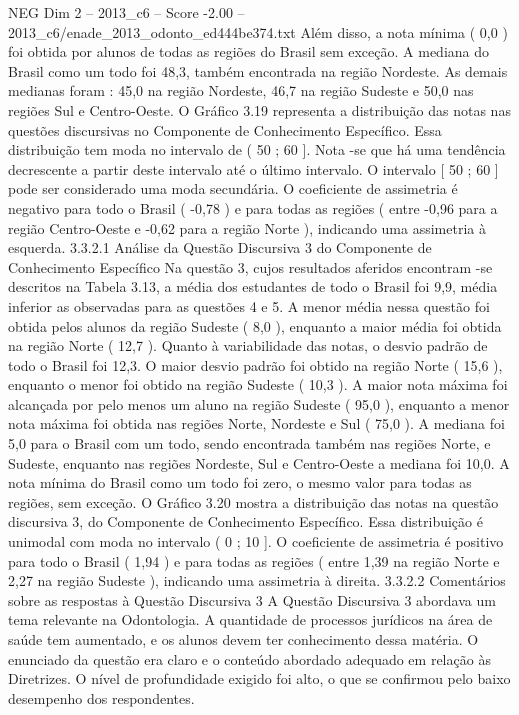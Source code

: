 \begin{textsample}{NEG Dim 2 – 2013\_c6 – Score -2.00 – 2013\_c6/enade\_2013\_odonto\_ed444be374.txt}
Além disso, a nota mínima ( 0,0 ) foi obtida por alunos de todas as regiões do Brasil sem exceção.
A mediana do Brasil como um todo foi 48,3, também encontrada na região Nordeste.
As demais medianas foram : 45,0 na região Nordeste, 46,7 na região Sudeste e 50,0 nas regiões Sul e Centro-Oeste.
O Gráfico 3.19 representa a distribuição das notas nas questões discursivas no Componente de Conhecimento Específico.
Essa distribuição tem moda no intervalo de ( 50 ; 60 ].
Nota -se que há uma tendência decrescente a partir deste intervalo até o último intervalo.
O intervalo [ 50 ; 60 ] pode ser considerado uma moda secundária.
O coeficiente de assimetria é negativo para todo o Brasil ( -0,78 ) e para todas as regiões ( entre -0,96 para a região Centro-Oeste e -0,62 para a região Norte ), indicando uma assimetria à esquerda. 3.3.2.1 Análise da Questão Discursiva 3 do Componente de Conhecimento Específico Na questão 3, cujos resultados aferidos encontram -se descritos na Tabela 3.13, a média dos estudantes de todo o Brasil foi 9,9, média inferior as observadas para as questões 4 e 5.
A menor média nessa questão foi obtida pelos alunos da região Sudeste ( 8,0 ), enquanto a maior média foi obtida na região Norte ( 12,7 ).
Quanto à variabilidade das notas, o desvio padrão de todo o Brasil foi 12,3.
O maior desvio padrão foi obtido na região Norte ( 15,6 ), enquanto o menor foi obtido na região Sudeste ( 10,3 ).
A maior nota máxima foi alcançada por pelo menos um aluno na região Sudeste ( 95,0 ), enquanto a menor nota máxima foi obtida nas regiões Norte, Nordeste e Sul ( 75,0 ).
A mediana foi 5,0 para o Brasil com um todo, sendo encontrada também nas regiões Norte, e Sudeste, enquanto nas regiões Nordeste, Sul e Centro-Oeste a mediana foi 10,0.
A nota mínima do Brasil como um todo foi zero, o mesmo valor para todas as regiões, sem exceção.
O Gráfico 3.20 mostra a distribuição das notas na questão discursiva 3, do Componente de Conhecimento Específico.
Essa distribuição é unimodal com moda no intervalo ( 0 ; 10 ].
O coeficiente de assimetria é positivo para todo o Brasil ( 1,94 ) e para todas as regiões ( entre 1,39 na região Norte e 2,27 na região Sudeste ), indicando uma assimetria à direita. 3.3.2.2 Comentários sobre as respostas à Questão Discursiva 3 A Questão Discursiva 3 abordava um tema relevante na Odontologia.
A quantidade de processos jurídicos na área de saúde tem aumentado, e os alunos devem ter conhecimento dessa matéria.
O enunciado da questão era claro e o conteúdo abordado adequado em relação às Diretrizes.
O nível de profundidade exigido foi alto, o que se confirmou pelo baixo desempenho dos respondentes.

\end{textsample}
